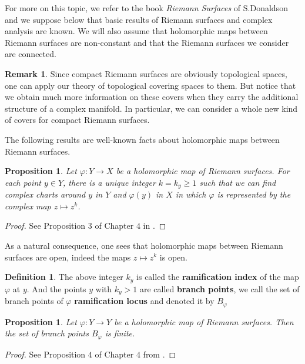 \documentclass{article}
\theoremstyle{plain}
\newtheorem{proposition}[theorem]{Proposition}
\theoremstyle{definition}
\newtheorem{definition}[theorem]{Definition}
\newtheorem{remark}{Remark}
\begin{document}
\noindent For more on this topic, we refer to the book \textit{Riemann Surfaces} \cite{Donaldson} of S.Donaldson and we suppose below that basic results of Riemann surfaces and complex analysis are known.
We will also assume that holomorphic maps between Riemann surfaces are non-constant and that the Riemann surfaces we consider are connected.

\begin{remark}
    Since compact Riemann surfaces are obviously topological spaces, one can apply our theory of topological covering spaces to them.
    But notice that we obtain much more information on these covers when they carry the additional structure of a complex manifold. 
    In particular, we can consider a whole new kind of covers for compact Riemann surfaces.
\end{remark}

\noindent The following results are well-known facts about holomorphic maps between Riemann surfaces.

\begin{proposition}
\label{holo_are_locally_ramified}
    Let $\varphi:Y\rightarrow X$ be a holomorphic map of Riemann surfaces. For each point $y\in Y$, there is a unique integer $k=k_y\ge 1$ such that we can find complex charts around $y$ in $Y$ and $\varphi(y)$ in $X$ in which $\varphi$ is represented by the complex map $z\mapsto z^k$.
\end{proposition}
\begin{proof}
    See Proposition $3$ of Chapter $4$ in \cite{Donaldson}.
\end{proof}

\noindent As a natural consequence, one sees that holomorphic maps between Riemann surfaces are open, indeed the maps $z\mapsto z^k$ is open.

\begin{definition}
    The above integer $k_y$ is called the \textbf{ramification index} of the map $\varphi$ at $y$. And the points $y$ with $k_y> 1$ are called \textbf{branch points}, we call the set of branch points of $\varphi$  \textbf{ramification locus} and denoted it by $B_{\varphi}$
\end{definition}

\begin{proposition}
    Let $\varphi: Y\rightarrow Y$ be a holomorphic map of Riemann surfaces. Then the set of branch points $B_{\varphi}$ is finite.
\end{proposition}
\begin{proof}
    See Proposition $4$ of Chapter $4$ from \cite{Donaldson}.
\end{proof}
\end{document}
